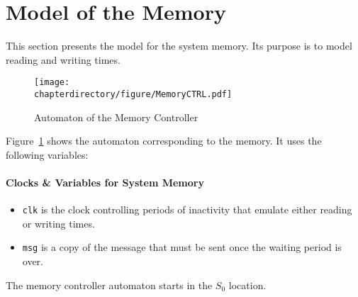 \section{Model of the Memory}
This section presents the model for the system memory. Its purpose is to
model reading and writing times.

\label{sec:model:memory}
\begin{figure}[hbt!]
\begin{center}
\texttt{[image: \\chapterdirectory/figure/MemoryCTRL.pdf]}
\end{center}
\caption{Automaton of the Memory Controller}
\label{fig:UPPAAL:MemoryCTRL}
\end{figure}

Figure~\ref{fig:UPPAAL:MemoryCTRL} shows the automaton corresponding to the
memory. It uses the following variables:
\paragraph{Clocks \& Variables for System Memory}
\begin{itemize}
\item
   \lstinline!clk! is the clock controlling periods of inactivity that
   emulate either reading or writing times.
\item
   \lstinline!msg! is a copy of the message that must be sent once the waiting
   period is over.
\end{itemize}

The memory controller automaton starts in the $S_0$ location.

